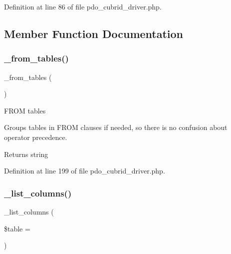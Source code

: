 Definition at line 86 of file pdo\+\_\+cubrid\+\_\+driver.\+php.



\subsection{Member Function Documentation}
\mbox{\label{class_c_i___d_b__pdo__cubrid__driver_aef43f7e3e7b71d337ff3724c5eb14f10}} 
\subsubsection{\texorpdfstring{\_from\_tables()}{\_from\_tables()}}
{\footnotesize\ttfamily \+\_\+from\+\_\+tables (\begin{DoxyParamCaption}{ }\end{DoxyParamCaption})\hspace{0.3cm}{\ttfamily [protected]}}

F\+R\+OM tables

Groups tables in F\+R\+OM clauses if needed, so there is no confusion about operator precedence.

\begin{DoxyReturn}{Returns}
string 
\end{DoxyReturn}


Definition at line 199 of file pdo\+\_\+cubrid\+\_\+driver.\+php.

\mbox{\label{class_c_i___d_b__pdo__cubrid__driver_a7ccb7f9c301fe7f0a9db701254142b63}} 
\subsubsection{\texorpdfstring{\_list\_columns()}{\_list\_columns()}}
{\footnotesize\ttfamily \+\_\+list\+\_\+columns (\begin{DoxyParamCaption}\item[{}]{\$table = {\ttfamily \textquotesingle{}\textquotesingle{}} }\end{DoxyParamCaption})\hspace{0.3cm}{\ttfamily [protected]}}

